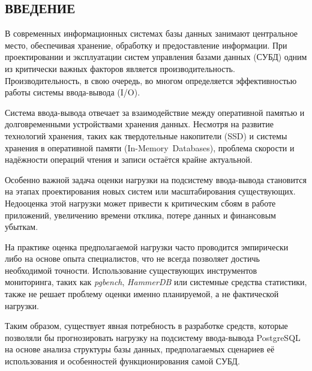 \begin{center}
    \section*{\centering ВВЕДЕНИЕ}
\end{center}

В современных ин\-фор\-ма\-ци\-он\-ных си\-сте\-мах ба\-зы дан\-ных за\-ни\-ма\-ют цен\-траль\-ное ме\-сто, 
обе\-спе\-чи\-вая хра\-не\-ние, об\-ра\-бот\-ку и предос\-тав\-ле\-ние ин\-фор\-ма\-ции. При про\-ек\-ти\-ро\-ва\-нии 
и экс\-плуа\-та\-ции си\-стем управ\-ле\-ния ба\-за\-ми дан\-ных (\mbox{СУБД}) од\-ним из кри\-ти\-че\-ски 
важ\-ных фак\-то\-ров яв\-ля\-ет\-ся про\-из\-во\-ди\-тель\-ность. Про\-из\-во\-ди\-тель\-ность, в сво\-ю оче\-редь, 
во мно\-гом опре\-де\-ля\-ет\-ся эф\-фек\-тив\-но\-стью ра\-бо\-ты си\-сте\-мы вво\-да-вы\-во\-да (I/O).

Си\-сте\-ма вво\-да-вы\-во\-да от\-ве\-ча\-ет за вза\-и\-мо\-дей\-ствие меж\-ду опе\-ра\-тив\-ной па\-мя\-тью и дол\-го\-вре\-мен\-ны\-ми 
уст\-рой\-ства\-ми хра\-не\-ния дан\-ных. Нес\-мот\-ря на раз\-ви\-тие тех\-но\-ло\-гий хра\-не\-ния, та\-ких как 
твер\-до\-тель\-ные на\-ко\-пи\-те\-ли (\mbox{SSD}) и си\-сте\-мы хра\-не\-ния в опе\-ра\-тив\-ной па\-мя\-ти 
(\mbox{In-Memory Databases}), про\-бле\-ма ско\-ро\-сти и на\-дёж\-но\-сти опе\-ра\-ций чте\-ния и за\-пи\-си 
ос\-та\-ёт\-ся край\-не ак\-ту\-аль\-ной.

Осо\-бен\-но важ\-ной за\-да\-ча оцен\-ки на\-груз\-ки на под\-си\-сте\-му вво\-да-вы\-во\-да ста\-но\-вит\-ся на 
эта\-пах про\-ек\-ти\-ро\-ва\-ния но\-вых си\-стем или мас\-шта\-би\-ро\-ва\-ния су\-ще\-ству\-ющих. Не\-до\-оцен\-ка 
этой на\-груз\-ки мо\-жет при\-ве\-сти к кри\-ти\-че\-ским сбо\-ям в ра\-бо\-те при\-ло\-же\-ний, уве\-ли\-че\-нию 
вре\-ме\-ни от\-кли\-ка, по\-те\-ре дан\-ных и фи\-нан\-со\-вым убыт\-кам.

На прак\-ти\-ке оцен\-ка пред\-по\-ла\-га\-е\-мой на\-груз\-ки час\-то про\-во\-дит\-ся эм\-пи\-ри\-че\-ски либо на 
ос\-но\-ве опы\-та спе\-ци\-а\-ли\-стов, что не всег\-да поз\-во\-ля\-ет дос\-тичь не\-об\-хо\-ди\-мой точ\-но\-сти. 
Ис\-поль\-зо\-ва\-ние су\-ще\-ству\-ющих ин\-стру\-мен\-тов мо\-ни\-то\-рин\-га, та\-ких как \textit{pgbench}, 
\textit{HammerDB} или си\-сте\-мные сред\-ства ста\-ти\-сти\-ки, так\-же не ре\-ша\-ет про\-бле\-му оцен\-ки 
имен\-но пла\-ни\-ру\-е\-мой, а не фак\-ти\-че\-ской на\-груз\-ки.

Та\-ким об\-ра\-зом, су\-ще\-ству\-ет яв\-ная по\-треб\-ность в раз\-ра\-бот\-ке средств, ко\-то\-рые поз\-во\-ля\-ли 
бы про\-гно\-зи\-ро\-вать на\-груз\-ку на под\-си\-сте\-му вво\-да-вы\-во\-да Post\-gre\-SQL на ос\-но\-ве ана\-ли\-за 
струк\-ту\-ры ба\-зы дан\-ных, пред\-по\-ла\-га\-е\-мых сце\-на\-ри\-ев её ис\-поль\-зо\-ва\-ния и осо\-бен\-но\-стей 
функ\-ци\-о\-ни\-ро\-ва\-ния са\-мой \mbox{СУБД}.
\vspace{5mm}

